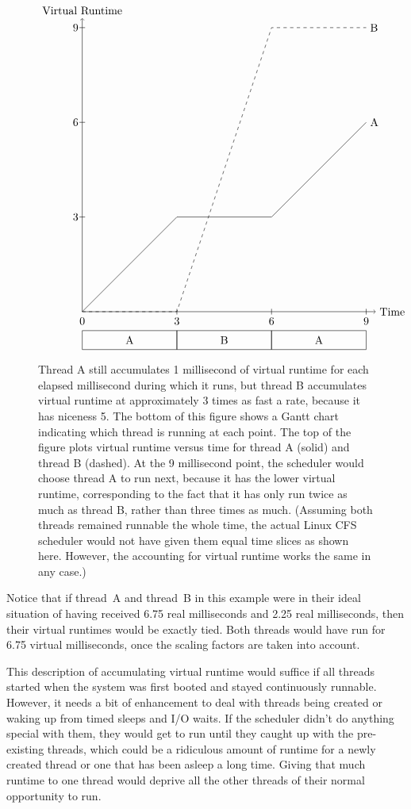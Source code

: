 \begin{figure}
\[\begin{tikzpicture}[scale=.03]
\draw (0,0) rectangle (100,20);
\draw (100,0) rectangle (200,20);
\draw (200,0) rectangle (300,20);
\draw (50,10) node{A};
\draw (150,10) node{B};
\draw (250,10) node{A};
\draw (0,30) node{0};
\draw (100,30) node{3};
\draw (100,37) -- (100,43);
\draw (200,30) node{6};
\draw (200,37) -- (200,43);
\draw (300,30) node{9};
\draw (300,37) -- (300,43);
\draw[->] (0,40) -- (310,40) node[right] {Time};
\draw[->] (0,40) -- (0,350) node[above] {Virtual Runtime};
\draw (0,40) -- (100,140) -- (200,140) -- (300, 240) node[right] {A};
\draw[dashed] (0,40) -- (100,40) -- (200,340) -- (300, 340) node[right] {B};
\draw (-7,140) node{3};
\draw (-3,140) -- (3,140);
\draw (-7,240) node{6};
\draw (-3,240) -- (3,240);
\draw (-7,340) node{9};
\draw (-3,340) -- (3,340);
\end{tikzpicture}\]
\caption{Thread A still accumulates 1 millisecond of virtual
runtime for each elapsed millisecond during which it runs, but thread B accumulates virtual
runtime at approximately 3 times as fast a rate, because it has niceness 5.  The bottom of this figure shows a Gantt
chart indicating which thread is running at each point.  The top of the figure plots virtual runtime versus time
for thread A (solid) and thread B (dashed). At the 9 millisecond point, the scheduler would choose
thread A to run next, because it has the lower virtual runtime, corresponding to the fact that it has
only run twice as much as thread B, rather than three times as much.
(Assuming both threads remained runnable the whole time, the actual Linux CFS scheduler
would not have given them equal time slices as shown here.  However, the accounting for
virtual runtime works the same in any case.)}\label{proportional-virtual-runtime-figure}
\end{figure}

Notice that if thread~A and thread~B in this example were in their ideal
situation of having received 6.75 real milliseconds and 2.25 real milliseconds,
then their virtual runtimes would be exactly tied.  Both threads would
have run for 6.75 virtual milliseconds, once the scaling factors are taken into account.

This description of accumulating virtual runtime would suffice if all
threads started when the system was first booted and stayed
continuously runnable.  However, it needs a bit of
enhancement to deal with threads being created or waking up from timed sleeps and I/O waits.
If the scheduler didn't do anything special with them, they would get
to run until they caught up with the pre-existing threads, which could
be a ridiculous amount of runtime for a newly created thread or one that
has been asleep a long time.  Giving that much runtime to one thread would
deprive all the other threads of their normal opportunity to run.

